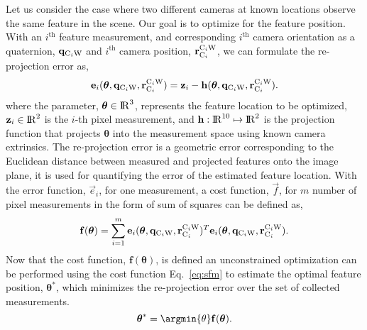 Let us consider the case where two different cameras at known locations observe
the same feature in the scene. Our goal is to optimize for the feature
position. With an $i^{\text{th}}$ feature measurement, and corresponding
$i^{\text{th}}$ camera orientation as a quaternion, ${{\mathbf{q}}}_{{\text{C}}_{i}{\text{W}}}$ and
$i^{\text{th}}$ camera position, ${{\mathbf{r}}}_{{\text{C}}_{i}}^{{\text{C}}_{i}{\text{W}}}$, we can
formulate the re-projection error as,
%
\begin{equation}
	\label{eq:bundle_adjustment_residual}
	\mathbf{e}_{i}(\boldsymbol{\theta},
								 {{\mathbf{q}}}_{{\text{C}}_{i}{\text{W}}},
								 {{\mathbf{r}}}_{{\text{C}}_{i}}^{{\text{C}}_{i}{\text{W}}})
	=
	{{\mathbf{z}}}_{i}
	- \mathbf{h}(\boldsymbol{\theta},
							 {{\mathbf{q}}}_{{\text{C}}_{i}{\text{W}}},
							 {{\mathbf{r}}}_{{\text{C}}_{i}}^{{\text{C}}_{i}{\text{W}}}).
\end{equation}
%
where the parameter, $\boldsymbol{\theta} \in {\rm I\!R}^{3}$, represents the
feature location to be optimized, ${{\mathbf{z}}}_{i} \in {\rm I\!R}^{2}$ is the
$i$-th pixel measurement, and $\mathbf{h} : {\rm I\!R}^{10} \mapsto {\rm I\!R}^{2}$ is
the projection function that projects $\boldsymbol{\theta}$ into the
measurement space using known camera extrinsics. The re-projection error is a
geometric error corresponding to the Euclidean distance between measured and
projected features onto the image plane, it is used for quantifying the error
of the estimated feature location. With the error function, $\Vec{e}_{i}$,
for one measurement, a cost function, $\Vec{f}$, for $m$ number of pixel
measurements in the form of sum of squares can be defined as,
%
\begin{equation}
  \label{eq:sfm}
  \mathbf{f}(\boldsymbol{\theta})
	= \sum^{m}_{i=1}
    \mathbf{e}_{i}(
	    \boldsymbol{\theta},
	    {{\mathbf{q}}}_{{\text{C}}_{i}{\text{W}}},
	    {{\mathbf{r}}}_{{\text{C}}_{i}}^{{\text{C}}_{i}{\text{W}}}
	)^{T}
	\mathbf{e}_{i}(
		\boldsymbol{\theta},
		{{\mathbf{q}}}_{{\text{C}}_{i}{\text{W}}},
		{{\mathbf{r}}}_{{\text{C}}_{i}}^{{\text{C}}_{i}{\text{W}}}
	).
\end{equation}
%
Now that the cost function, $\mathbf{f}(\boldsymbol{\theta})$, is defined an
unconstrained optimization can be performed using the cost function
Eq.~\ref{eq:sfm} to estimate the optimal feature position,
$\boldsymbol{\theta}^{*}$, which minimizes the re-projection error over the set
of collected measurements.
%
\begin{equation}
	\boldsymbol{\theta}^{*} = \argmin{\theta} \mathbf{f}(\boldsymbol{\theta}).
\end{equation}
%



